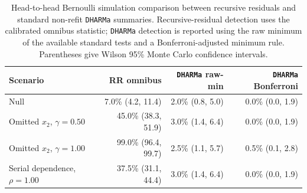 \begin{table}[htbp]
\small
\setlength{\tabcolsep}{4pt}
\caption{Head-to-head Bernoulli simulation comparison between recursive residuals and standard non-refit \texttt{DHARMa} summaries. Recursive-residual detection uses the calibrated omnibus statistic; \texttt{DHARMa} detection is reported using the raw minimum of the available standard tests and a Bonferroni-adjusted minimum rule. Parentheses give Wilson 95\% Monte Carlo confidence intervals.}
\label{tab:dharma-head-to-head-bernoulli}
\begin{tabularx}{\textwidth}{@{}>{\raggedright\arraybackslash}X r r r@{}}
\toprule
Scenario & RR omnibus & \texttt{DHARMa} raw-min & \texttt{DHARMa} Bonferroni \\
\midrule
Null & 7.0\% (4.2, 11.4) & 2.0\% (0.8, 5.0) & 0.0\% (0.0, 1.9) \\
Omitted $x_2$, $\gamma=0.50$ & 45.0\% (38.3, 51.9) & 3.0\% (1.4, 6.4) & 0.0\% (0.0, 1.9) \\
Omitted $x_2$, $\gamma=1.00$ & 99.0\% (96.4, 99.7) & 2.5\% (1.1, 5.7) & 0.5\% (0.1, 2.8) \\
Serial dependence, $\rho=1.00$ & 37.5\% (31.1, 44.4) & 3.0\% (1.4, 6.4) & 0.0\% (0.0, 1.9) \\
\bottomrule
\end{tabularx}
\end{table}
